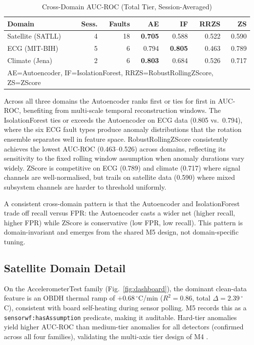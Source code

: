 \documentclass[conference]{IEEEtran}
\begin{document}
\begin{table}[t]
\caption{Cross-Domain AUC-ROC (Total Tier, Session-Averaged)}
\label{tab:crossdomain}
\centering
\scriptsize
\setlength{\tabcolsep}{3.5pt}
\begin{tabular}{@{}lrrrrrr@{}}
\toprule
\textbf{Domain} & \textbf{Sess.} & \textbf{Faults} & \textbf{AE} & \textbf{IF} & \textbf{RRZS} & \textbf{ZS} \\
\midrule
Satellite (SATLL)    & 4 & 18 & \textbf{0.705} & 0.588 & 0.522 & 0.590 \\
ECG (MIT-BIH)        & 5 &  6 & 0.794 & \textbf{0.805} & 0.463 & 0.789 \\
Climate (Jena)       & 2 &  6 & \textbf{0.803} & 0.684 & 0.526 & 0.717 \\
\bottomrule
\multicolumn{7}{l}{\scriptsize AE=Autoencoder, IF=IsolationForest, RRZS=RobustRollingZScore, ZS=ZScore}
\end{tabular}
\end{table}

Across all three domains the Autoencoder ranks first or ties for first in
AUC-ROC, benefiting from multi-scale temporal reconstruction windows. The
IsolationForest ties or exceeds the Autoencoder on ECG data (0.805 vs.\ 0.794),
where the six ECG fault types produce anomaly distributions that the rotation
ensemble separates well in feature space. RobustRollingZScore consistently achieves
the lowest AUC-ROC (0.463--0.526) across domains, reflecting its sensitivity to
the fixed rolling window assumption when anomaly durations vary widely. ZScore
is competitive on ECG (0.789) and climate (0.717) where signal channels are
well-normalised, but trails on satellite data (0.590) where mixed subsystem
channels are harder to threshold uniformly.

A consistent cross-domain pattern is that the Autoencoder and IsolationForest
trade off recall versus FPR: the Autoencoder casts a wider net (higher recall,
higher FPR) while ZScore is conservative (low FPR, low recall). This pattern
is domain-invariant and emerges from the shared M5 design, not domain-specific
tuning.

\subsection{Satellite Domain Detail}

On the AccelerometerTest family (Fig.~\ref{fig:dashboard}), the dominant clean-data
feature is an OBDH thermal ramp of $+0.68\,^{\circ}$C/min ($R^2 = 0.86$, total
$\Delta = 2.39\,^{\circ}$C), consistent with board self-heating during sensor
polling. M5 records this as a \texttt{sensorwf:hasAssumption} predicate, making
it auditable. Hard-tier anomalies yield higher AUC-ROC than medium-tier anomalies
for all detectors (confirmed across all four families), validating the multi-axis
tier design of M4 \cite{wu2022benchmarks}.
\end{document}
